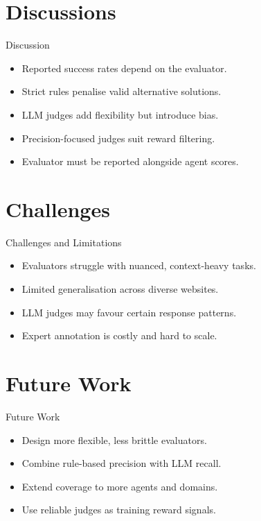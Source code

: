 \documentclass{beamer}
\begin{document}
\section{Discussions}
\begin{frame}{Discussion}
\begin{itemize}
\item Reported success rates depend on the evaluator.
\item Strict rules penalise valid alternative solutions.
\item LLM judges add flexibility but introduce bias.
\item Precision-focused judges suit reward filtering.
\item Evaluator must be reported alongside agent scores.
\end{itemize}
\end{frame}

\section{Challenges}
\begin{frame}{Challenges and Limitations}
\begin{itemize}
\item Evaluators struggle with nuanced, context-heavy tasks.
\item Limited generalisation across diverse websites.
\item LLM judges may favour certain response patterns.
\item Expert annotation is costly and hard to scale.
\end{itemize}
\end{frame}

\section{Future Work}
\begin{frame}{Future Work}
\begin{itemize}
\item Design more flexible, less brittle evaluators.
\item Combine rule-based precision with LLM recall.
\item Extend coverage to more agents and domains.
\item Use reliable judges as training reward signals.
\end{itemize}
\end{frame}
\end{document}
